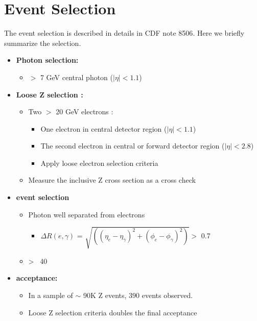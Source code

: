 \documentclass[12pt,twoside,letterpaper]{article}
\begin{document}
\section{Event Selection}\label{Sec:EventSel}
The \Zg event selection is described in details in CDF note 8506\cite{Zgnote}. Here
we briefly summarize the selection.

    \begin{itemize}
       \item {\textbf{Photon selection: }}
	  \begin{itemize}
	    \item \Et $> $ 7 GeV central photon ($|\eta| < 1.1$)
	  \end{itemize}
       \item {\textbf{Loose Z selection :}} 
	  \begin{itemize}
	     \item  Two \Et $> $ 20 GeV electrons :  
	      \begin{itemize}
		  \item One electron in central detector region ($|\eta| < 1.1$)
		  \item The second electron in central or forward detector region ($|\eta| < 2.8$)
		    \item Apply loose electron selection criteria
	      \end{itemize}
	     \item Measure the inclusive Z cross section as a cross check
	  \end{itemize}
      \item {\textbf{\Zg event selection}}
	   \begin{itemize}
	       \item Photon well separated from electrons
	      \begin{itemize}
		  \item $\Delta R(e,\gamma)$ = $\sqrt{( (\eta_e - \eta_{\gamma})^2 + (\phi_e - \phi_{\gamma})^2  )} > $  0.7
	       \end{itemize}
	       \item \Mee \textgreater~ 40 \GeVCC
	  \end{itemize}
      \item {\textbf{\Zg acceptance:}} 
	  \begin{itemize}
	    \item In a sample of $\sim$ 90K Z events, $390$ \Zg events observed. 
 	    \item Loose Z selection criteria doubles the final \Zg acceptance
	  \end{itemize}
    \end{itemize}
\end{document}
